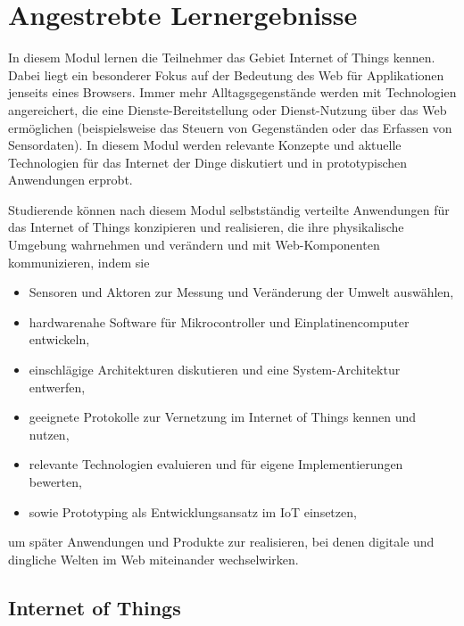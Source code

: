 \hypertarget{angestrebte-lernergebnissepathlabelmi-2017modulbeschreibungen-bachelorba_wd_internet-of-things}{%
\section*{Angestrebte
Lernergebnisse\label{/mi-2017/modulbeschreibungen-bachelor/BA_WD_Internet-of-things}}\label{angestrebte-lernergebnissepathlabelmi-2017modulbeschreibungen-bachelorba_wd_internet-of-things}}

In diesem Modul lernen die Teilnehmer das Gebiet Internet of Things
kennen. Dabei liegt ein besonderer Fokus auf der Bedeutung des Web für
Applikationen jenseits eines Browsers. Immer mehr Alltagsgegenstände
werden mit Technologien angereichert, die eine Dienste-Bereitstellung
oder Dienst-Nutzung über das Web ermöglichen (beispielsweise das Steuern
von Gegenständen oder das Erfassen von Sensordaten). In diesem Modul
werden relevante Konzepte und aktuelle Technologien für das Internet der
Dinge diskutiert und in prototypischen Anwendungen erprobt.

Studierende können nach diesem Modul selbstständig verteilte Anwendungen
für das Internet of Things konzipieren und realisieren, die ihre
physikalische Umgebung wahrnehmen und verändern und mit Web-Komponenten
kommunizieren, indem sie

\begin{itemize}
\tightlist
\item
  Sensoren und Aktoren zur Messung und Veränderung der Umwelt auswählen,
\item
  hardwarenahe Software für Mikrocontroller und Einplatinencomputer
  entwickeln,
\item
  einschlägige Architekturen diskutieren und eine System-Architektur
  entwerfen,
\item
  geeignete Protokolle zur Vernetzung im Internet of Things kennen und
  nutzen,
\item
  relevante Technologien evaluieren und für eigene Implementierungen
  bewerten,
\item
  sowie Prototyping als Entwicklungsansatz im IoT einsetzen,
\end{itemize}

um später Anwendungen und Produkte zur realisieren, bei denen digitale
und dingliche Welten im Web miteinander wechselwirken.

\hypertarget{internet-of-thingspathlabelmi-2017modulbeschreibungen-bachelorba_wd_internet-of-things-1}{%
\subsection*{Internet of
Things\label{/mi-2017/modulbeschreibungen-bachelor/BA_WD_Internet-of-things}}\label{internet-of-thingspathlabelmi-2017modulbeschreibungen-bachelorba_wd_internet-of-things-1}}

